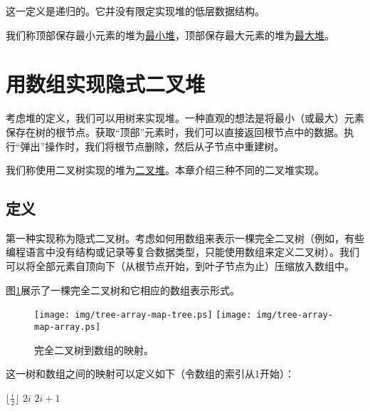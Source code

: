 \documentclass[UTF8]{article}
\begin{document}
这一定义是递归的。它并没有限定实现堆的低层数据结构。

我们称顶部保存最小元素的堆为\underline{最小堆}，顶部保存最大元素的堆为\underline{最大堆}。

\section{用数组实现隐式二叉堆}
\label{ibheap}

考虑堆的定义，我们可以用树来实现堆。一种直观的想法是将最小（或最大）元素保存在树的根节点。获取“顶部”元素时，我们可以直接返回根节点中的数据。执行“弹出”操作时，我们将根节点删除，然后从子节点中重建树。

我们称使用二叉树实现的堆为\underline{二叉堆}。本章介绍三种不同的二叉堆实现。

\subsection{定义}

第一种实现称为隐式二叉树。考虑如何用数组来表示一棵完全二叉树（例如，有些编程语言中没有结构或记录等复合数据类型，只能使用数组来定义二叉树）。我们可以将全部元素自顶向下（从根节点开始，到叶子节点为止）压缩放入数组中。

图\ref{fig:tree-array-map}展示了一棵完全二叉树和它相应的数组表示形式。

\begin{figure}[htbp]
       \begin{center}
       	  \texttt{[image: img/tree-array-map-tree.ps]}
          \texttt{[image: img/tree-array-map-array.ps]}
        \caption{完全二叉树到数组的映射。} \label{fig:tree-array-map}
       \end{center}
\end{figure}

这一树和数组之间的映射可以定义如下（令数组的索引从1开始）：

\begin{algorithmic}[1]
  \State \Return $\lfloor \frac{i}{2} \rfloor$
\EndFunction
\Statex
{}
  \State \Return $2i$
\EndFunction
\Statex
{}
  \State \Return $2i+1$
\EndFunction
\end{algorithmic}
\end{document}
